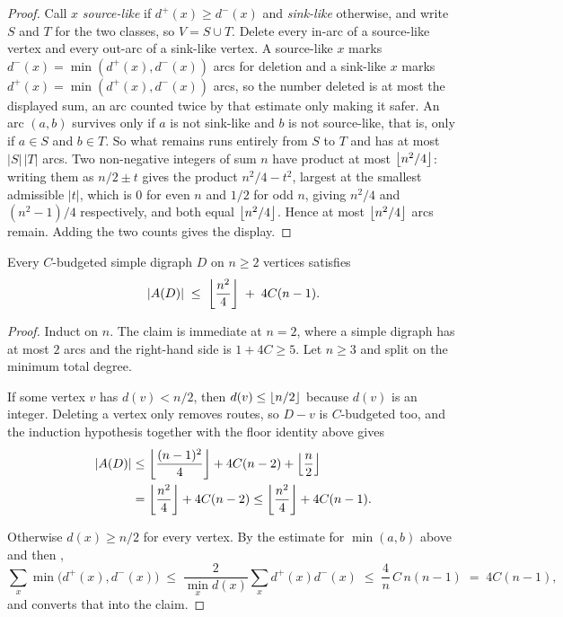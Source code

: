 \begin{proof}
Call $x$ \emph{source-like} if $d^+(x) \ge d^-(x)$ and \emph{sink-like} otherwise, and write $S$ and $T$ for the two classes, so $V = S \cup T$. Delete every in-arc of a source-like vertex and every out-arc of a sink-like vertex. A source-like $x$ marks $d^-(x) = \min(d^+(x), d^-(x))$ arcs for deletion and a sink-like $x$ marks $d^+(x) = \min(d^+(x), d^-(x))$ arcs, so the number deleted is at most the displayed sum, an arc counted twice by that estimate only making it safer. An arc $(a,b)$ survives only if $a$ is not sink-like and $b$ is not source-like, that is, only if $a \in S$ and $b \in T$. So what remains runs entirely from $S$ to $T$ and has at most $|S|\,|T|$ arcs. Two non-negative integers of sum $n$ have product at most $\left\lfloor n^2/4 \right\rfloor$: writing them as $n/2 \pm t$ gives the product $n^2/4 - t^2$, largest at the smallest admissible $|t|$, which is $0$ for even $n$ and $1/2$ for odd $n$, giving $n^2/4$ and $(n^2-1)/4$ respectively, and both equal $\left\lfloor n^2/4 \right\rfloor$. Hence at most $\left\lfloor n^2/4 \right\rfloor$ arcs remain. Adding the two counts gives the display.
\end{proof}

\begin{lemma}\label{lem:two-step-budget}
Every $C$-budgeted simple digraph $D$ on $n \ge 2$ vertices satisfies
\[
    |A(D)| \;\le\; \left\lfloor \frac{n^2}{4} \right\rfloor \;+\; 4C(n-1).
\]
\end{lemma}

\begin{proof}
Induct on $n$. The claim is immediate at $n = 2$, where a simple digraph has at most $2$ arcs and the right-hand side is $1 + 4C \ge 5$. Let $n \ge 3$ and split on the minimum total degree.

If some vertex $v$ has $d(v) < n/2$, then $d(v) \le \left\lfloor n/2 \right\rfloor$ because $d(v)$ is an integer. Deleting a vertex only removes routes, so $D - v$ is $C$-budgeted too, and the induction hypothesis together with the floor identity above gives
\[
\begin{aligned}
    |A(D)|
    &\le \left\lfloor \frac{(n-1)^2}{4} \right\rfloor+4C(n-2)+\left\lfloor \frac{n}{2} \right\rfloor \\
    &= \left\lfloor \frac{n^2}{4} \right\rfloor+4C(n-2)
    \le \left\lfloor \frac{n^2}{4} \right\rfloor+4C(n-1).
\end{aligned}
\]

Otherwise $d(x) \ge n/2$ for every vertex. By the estimate for $\min(a,b)$ above and then ,
\[
    \sum_x\min\bigl(d^+(x),d^-(x)\bigr)
    \;\le\; \frac{2}{\min_x d(x)}\sum_x d^+(x)d^-(x)
    \;\le\; \frac4n\,C\,n(n-1)
    \;=\; 4C(n-1),
\]
and  converts that into the claim.
\end{proof}

